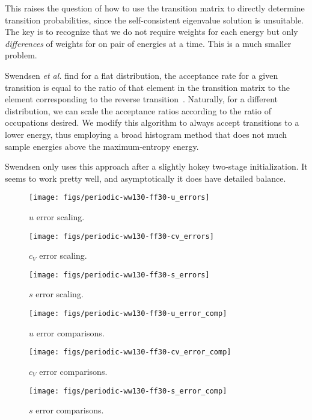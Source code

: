 \documentclass[letterpaper,twocolumn,amsmath,amssymb,pre,aps,10pt]{revtex4-1}
\begin{document}
This raises the question of how to use the transition matrix to
directly determine transition probabilities, since the self-consistent
eigenvalue solution is unsuitable.  The key is to recognize that we do
not require weights for each energy but only \emph{differences} of
weights for on pair of energies at a time.  This is a much smaller
problem.

Swendsen \emph{et al.} find for a flat distribution, the acceptance
rate for a given transition is equal to the ratio of that element in
the transition matrix to the element corresponding to the reverse
transition~\cite{swendsen1999transition}.  Naturally, for a different
distribution, we can scale the acceptance ratios according to the
ratio of occupations desired.  We modify this algorithm to always
accept transitions to a lower energy, thus employing a broad histogram
method that does not much sample energies above the maximum-entropy
energy.

Swendsen only uses this approach after a slightly hokey two-stage
initialization.  It seems to work pretty well, and asymptotically it
does have detailed balance.

\newpage

\begin{figure}[p]
  \texttt{[image: figs/periodic-ww130-ff30-u\_errors]}
  \caption{$u$ error scaling.}
  \label{fig:scaling-u_err}
\end{figure}
\begin{figure}[p]
  \texttt{[image: figs/periodic-ww130-ff30-cv\_errors]}
  \caption{$c_V$ error scaling.}
  \label{fig:scaling-cv_err}
\end{figure}
\begin{figure}[p]
  \texttt{[image: figs/periodic-ww130-ff30-s\_errors]}
  \caption{$s$ error scaling.}
  \label{fig:scaling-s_err}
\end{figure}

\begin{figure}[p]
  \texttt{[image: figs/periodic-ww130-ff30-u\_error\_comp]}
  \caption{$u$ error comparisons.}
  \label{fig:scaling-u_err_comp}
\end{figure}
\begin{figure}[p]
  \texttt{[image: figs/periodic-ww130-ff30-cv\_error\_comp]}
  \caption{$c_V$ error comparisons.}
  \label{fig:scaling-cv_err_comp}
\end{figure}
\begin{figure}[p]
  \texttt{[image: figs/periodic-ww130-ff30-s\_error\_comp]}
  \caption{$s$ error comparisons.}
  \label{fig:scaling-s_err_comp}
\end{figure}
\end{document}
